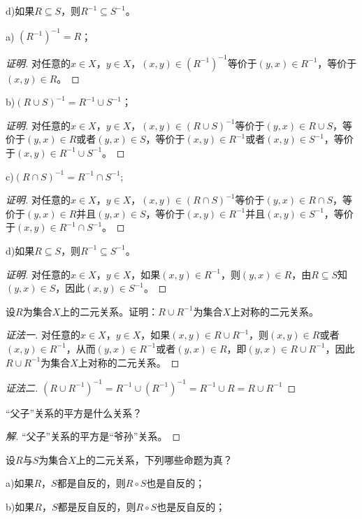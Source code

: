 \documentclass{article}
\begin{document}
\begin{CJK}{UTF8}{gbsn}
\begin{Exercise}
  d)如果$R\subseteq S$，则$R^{-1}\subseteq S^{-1}$。
\end{Exercise}
a) $(R^{-1})^{-1}=R$；
\begin{proof}[证明]
  对任意的$x\in X$，$y\in X$，$(x,y)\in (R^{-1})^{-1}$等价于$(y,x)\in R^{-1}$，等价于$(x,y)\in R$。
\end{proof}
b)$(R\cup S)^{-1}=R^{-1}\cup S^{-1}$；
\begin{proof}[证明]
  对任意的$x\in X$，$y\in X$，$(x,y)\in (R\cup S)^{-1}$等价于$(y,x)\in R\cup S$，等价于$(y,x)\in R$或者$(y,x)\in S$，等价于$(x,y)\in R^{-1}$或者$(x,y)\in S^{-1}$，等价于$(x,y)\in R^{-1}\cup S^{-1}$。
\end{proof}
c)$(R\cap S)^{-1}=R^{-1}\cap S^{-1}$;
\begin{proof}[证明]
  对任意的$x\in X$，$y\in X$，$(x,y)\in (R\cap S)^{-1}$等价于$(y,x)\in R\cap S$，等价于$(y,x)\in R$并且$(y,x)\in S$，等价于$(x,y)\in R^{-1}$并且$(x,y)\in S^{-1}$，等价于$(x,y)\in R^{-1}\cap S^{-1}$。
\end{proof}
d)如果$R\subseteq S$，则$R^{-1}\subseteq S^{-1}$。
\begin{proof}[证明]
  对任意的$x\in X$，$y\in X$，如果$(x,y)\in R^{-1}$，则$(y,x)\in R$，由$R\subseteq S$知$(y,x)\in S$，因此$(x,y)\in S^{-1}$。
\end{proof}
\begin{Exercise}
  设$R$为集合$X$上的二元关系。证明：$R\cup R^{-1}$为集合$X$上对称的二元关系。
\end{Exercise}
\begin{proof}[证法一]
  对任意的$x\in X$，$y\in X$，如果$(x,y)\in R\cup R^{-1}$，则$(x,y)\in R$或者$(x,y)\in R^{-1}$，从而$(y,x)\in R^{-1}$或者$(y,x)\in R$，即$(y,x)\in R\cup R^{-1}$，因此$R\cup R^{-1}$为集合$X$上对称的二元关系。
\end{proof}
\begin{proof}[证法二]
  $(R\cup R^{-1})^{-1}=R^{-1}\cup (R^{-1})^{-1}=R^{-1}\cup R = R\cup R^{-1}$
\end{proof}
\begin{Exercise}
  “父子”关系的平方是什么关系？
\end{Exercise}
\begin{proof}[解]
  “父子”关系的平方是“爷孙”关系。
\end{proof}
\begin{Exercise}
  设$R$与$S$为集合$X$上的二元关系，下列哪些命题为真？

  a)如果$R$，$S$都是自反的，则$R\circ S$也是自反的；

  b)如果$R$，$S$都是反自反的，则$R\circ S$也是反自反的；


\end{Exercise}
\end{CJK}
\end{document}

